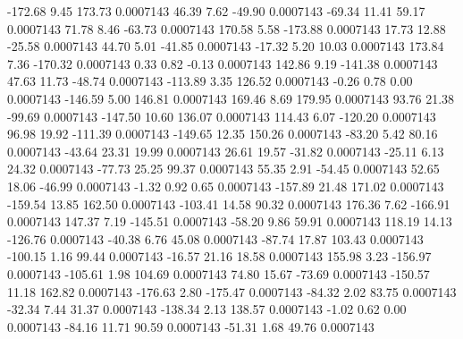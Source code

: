      -172.68        9.45      173.73     0.0007143
       46.39        7.62      -49.90     0.0007143
      -69.34       11.41       59.17     0.0007143
       71.78        8.46      -63.73     0.0007143
      170.58        5.58     -173.88     0.0007143
       17.73       12.88      -25.58     0.0007143
       44.70        5.01      -41.85     0.0007143
      -17.32        5.20       10.03     0.0007143
      173.84        7.36     -170.32     0.0007143
        0.33        0.82       -0.13     0.0007143
      142.86        9.19     -141.38     0.0007143
       47.63       11.73      -48.74     0.0007143
     -113.89        3.35      126.52     0.0007143
       -0.26        0.78        0.00     0.0007143
     -146.59        5.00      146.81     0.0007143
      169.46        8.69      179.95     0.0007143
       93.76       21.38      -99.69     0.0007143
     -147.50       10.60      136.07     0.0007143
      114.43        6.07     -120.20     0.0007143
       96.98       19.92     -111.39     0.0007143
     -149.65       12.35      150.26     0.0007143
      -83.20        5.42       80.16     0.0007143
      -43.64       23.31       19.99     0.0007143
       26.61       19.57      -31.82     0.0007143
      -25.11        6.13       24.32     0.0007143
      -77.73       25.25       99.37     0.0007143
       55.35        2.91      -54.45     0.0007143
       52.65       18.06      -46.99     0.0007143
       -1.32        0.92        0.65     0.0007143
     -157.89       21.48      171.02     0.0007143
     -159.54       13.85      162.50     0.0007143
     -103.41       14.58       90.32     0.0007143
      176.36        7.62     -166.91     0.0007143
      147.37        7.19     -145.51     0.0007143
      -58.20        9.86       59.91     0.0007143
      118.19       14.13     -126.76     0.0007143
      -40.38        6.76       45.08     0.0007143
      -87.74       17.87      103.43     0.0007143
     -100.15        1.16       99.44     0.0007143
      -16.57       21.16       18.58     0.0007143
      155.98        3.23     -156.97     0.0007143
     -105.61        1.98      104.69     0.0007143
       74.80       15.67      -73.69     0.0007143
     -150.57       11.18      162.82     0.0007143
     -176.63        2.80     -175.47     0.0007143
      -84.32        2.02       83.75     0.0007143
      -32.34        7.44       31.37     0.0007143
     -138.34        2.13      138.57     0.0007143
       -1.02        0.62        0.00     0.0007143
      -84.16       11.71       90.59     0.0007143
      -51.31        1.68       49.76     0.0007143
